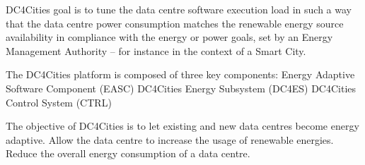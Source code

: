%
%
%

DC4Cities goal is to tune the data centre software execution load in such a way that the data centre power consumption matches the renewable energy source availability in compliance with the energy or power goals, set by an Energy Management Authority – for instance in the context of a Smart City.

The DC4Cities platform is composed of three key components:
Energy Adaptive Software Component (EASC)
DC4Cities Energy Subsystem (DC4ES) 
DC4Cities Control System (CTRL)

The objective of DC4Cities is to let existing and new data centres become energy adaptive. 
Allow the data centre to increase the usage of renewable energies.
Reduce the overall energy consumption of a data centre.

